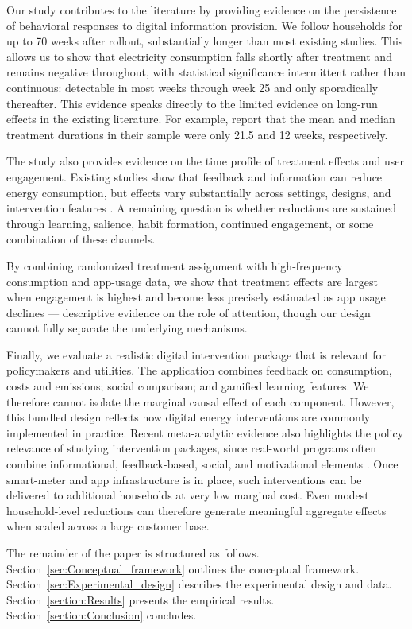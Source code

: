 Our study contributes to the literature by providing evidence on the persistence of behavioral responses to digital information provision. We follow households for up to 70 weeks after rollout, substantially longer than most existing studies. This allows us to show that electricity consumption falls shortly after treatment and remains negative throughout, with statistical significance intermittent rather than continuous: detectable in most weeks through week 25 and only sporadically thereafter. This evidence speaks directly to the limited evidence on long-run effects in the existing literature. For example, \citet{khannaMulticountryMetaanalysisRole2021} report that the mean and median treatment durations in their sample were only 21.5 and 12 weeks, respectively.

The study also provides evidence on the time profile of treatment effects and user engagement. Existing studies show that feedback and information can reduce energy consumption, but effects vary substantially across settings, designs, and intervention features \citep{delmasInformationStrategiesEnergy2013,karlinEffectsFeedbackEnergy2015,andorBehavioralEconomicsEnergy2018,khannaBehavioralInformationMonetary2025}. A remaining question is whether reductions are sustained through learning, salience, habit formation, continued engagement, or some combination of these channels. 

By combining randomized treatment assignment with high-frequency consumption and app-usage data, we show that treatment effects are largest when engagement is highest and become less precisely estimated as app usage declines — descriptive evidence on the role of attention, though our design cannot fully separate the underlying mechanisms.

Finally, we evaluate a realistic digital intervention package that is relevant for policymakers and utilities. The application combines feedback on consumption, costs and emissions; social comparison; and gamified learning features. We therefore cannot isolate the marginal causal effect of each component. However, this bundled design reflects how digital energy interventions are commonly implemented in practice. Recent meta-analytic evidence also highlights the policy relevance of studying intervention packages, since real-world programs often combine informational, feedback-based, social, and motivational elements \citep{khannaBehavioralInformationMonetary2025}. Once smart-meter and app infrastructure is in place, such interventions can be delivered to additional households at very low marginal cost. Even modest household-level reductions can therefore generate meaningful aggregate effects when scaled across a large customer base.

The remainder of the paper is structured as follows. Section~\ref{sec:Conceptual_framework} outlines the conceptual framework. Section~\ref{sec:Experimental_design} describes the experimental design and data. Section~\ref{section:Results} presents the empirical results. Section~\ref{section:Conclusion} concludes.